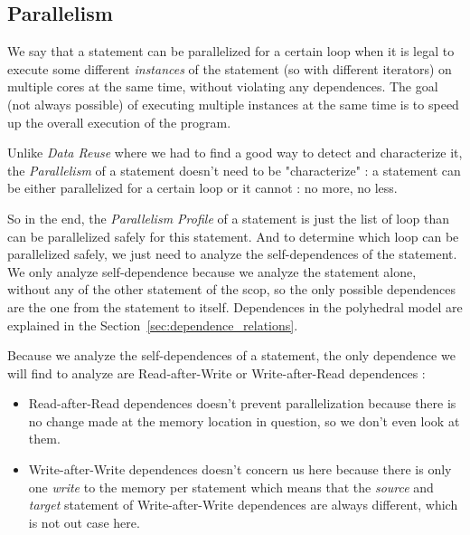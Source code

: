 \documentclass[paper=a4, fontsize=11.5pt]{scrartcl}
\numberwithin{equation}{section}        %
\numberwithin{figure}{section}          %
\numberwithin{table}{section}               %
\begin{document}
    \subsection{Parallelism}
        We say that a statement can be parallelized for a certain loop when it is legal to
        execute some different \textit{instances} of the statement (so with different iterators)
        on multiple cores at the same time, without violating any dependences. The
        goal (not always possible) of executing multiple instances at the same time is to
        speed up the overall execution of the program.

        Unlike \textit{Data Reuse} where we had to find a good way to detect and characterize it,
        the \textit{Parallelism} of a statement doesn't need to be "characterize" :
        a statement can be either parallelized for a certain loop or it cannot : no more, no less.

        So in the end, the \textit{Parallelism Profile} of a statement is just the list
        of loop than can be parallelized safely for this statement.
        And to determine which loop can be parallelized safely, we just need to analyze
        the \glspl{self-dependence} of the statement. We only analyze \gls{self-dependence}
        because we analyze the statement alone, without any of the other statement of
        the scop, so the only possible dependences are the one from the statement to itself.
        Dependences in the polyhedral model are explained in the Section~\ref{sec:dependence_relations}.
       
        \bigskip

        Because we analyze the \glspl{self-dependence} of a statement, the only
        dependence we will find to analyze are Read-after-Write or Write-after-Read dependences :
        \begin{itemize}
            \item Read-after-Read dependences doesn't prevent parallelization because there is no
                change made at the memory location in question, so we don't even look at them.
        
            \item Write-after-Write dependences doesn't concern us here because there is
                only one \textit{write} to the memory per statement which means that
                the \textit{source} and \textit{target} statement of Write-after-Write
                dependences are always different, which is not out case here.
        \end{itemize}
        
\end{document}
